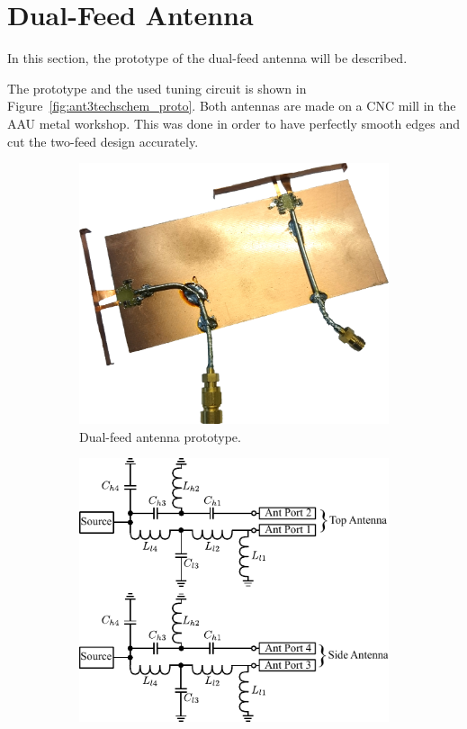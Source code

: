 \section{Dual-Feed Antenna}
In this section, the prototype of the dual-feed antenna will be described.

The prototype and the used tuning circuit is shown in Figure~\ref{fig:ant3techschem_proto}. Both antennas are made on a CNC mill in the AAU metal workshop. This was done in order to have perfectly smooth edges and cut the two-feed design accurately.   

\begin{figure}[htbp]
    \begin{subfigure}[b]{0.49\linewidth}
        \centering
        \includegraphics[scale=0.1]{img/tech_sol/nonresonant/prototype/3d_figure.jpg}
        \caption{Dual-feed antenna prototype.}
        \label{fig:nonresonant_proto}
    \end{subfigure}
    \hfill
    \begin{subfigure}[b]{0.49\linewidth}
        \centering
        \includegraphics{img/tech_sol/nonresonant/schematic_tuning}\\[0cm]

\end{subfigure}
\end{figure}
